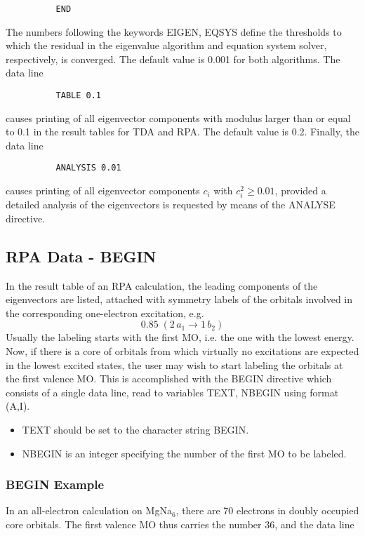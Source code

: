 \documentclass[11pt,fleqn]{article}
\begin{document}
{
\footnotesize
\begin{verbatim}
          END
\end{verbatim}
}
The numbers following the keywords EIGEN, EQSYS define the thresholds to which
the residual in the eigenvalue algorithm and equation system solver, 
respectively, is converged. The default value is 0.001 for both algorithms.
The data line

{
\footnotesize
\begin{verbatim}
          TABLE 0.1
\end{verbatim}
}
causes printing of all eigenvector components with modulus larger than or
equal to 0.1 in the result tables for TDA and RPA. The default value is 0.2.
Finally, the data line

{
\footnotesize
\begin{verbatim}
          ANALYSIS 0.01
\end{verbatim}
}
causes printing of all eigenvector components $c_i$ with $c^2_i\geq 0.01$,
provided a detailed analysis of the eigenvectors is requested by means of
the ANALYSE directive.
%
\subsection{RPA Data - BEGIN}
In the result table of an RPA calculation, the leading components of the
eigenvectors are listed, attached with symmetry labels of the orbitals
involved in the corresponding one-electron excitation, e.g.
$$ 0.85\;(2\,a_1\rightarrow 1\,b_2) $$
Usually the labeling starts with the first MO, i.e. the one with the lowest
energy. Now, if there is a core of orbitals from which virtually no
excitations are expected in the lowest excited states, the user may wish to
start labeling the orbitals at the first valence MO. This is accomplished
with the BEGIN directive which consists of a single data line, read to
variables TEXT, NBEGIN using format (A,I). 
\begin{itemize}
\item TEXT should be set to the character string BEGIN.
\item NBEGIN is an integer specifying the number of the first MO to be labeled.
\end{itemize}
%
\subsubsection{BEGIN Example}
In an all-electron calculation on MgNa$_6$, there are 70 electrons in
doubly occupied core orbitals. The first valence MO thus carries the
number 36, and the data line
\end{document}
